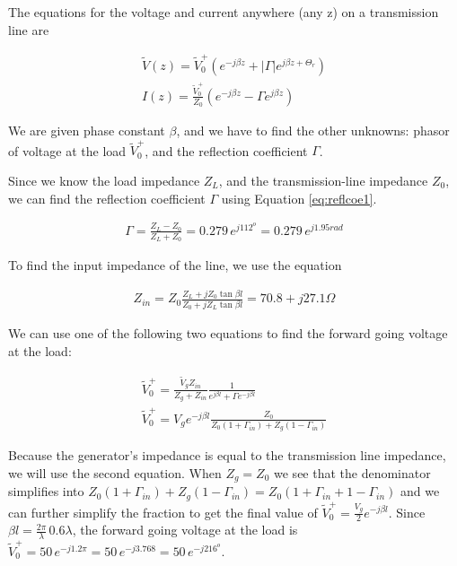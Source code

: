 \documentclass{ximera}
\begin{document}
\begin{example}
\begin{explanation}

The equations for the voltage and current anywhere (any z) on a transmission line  are


\begin{eqnarray}
\tilde{V}(z)= \tilde{V}_0^+ (e^{-j \beta z} + |\Gamma|  e^{j \beta z + \Theta_r}  ) \label{eq:vtlfin} \\
I(z)=   \frac{\tilde{V}_0^+}{Z_0}  (e^{-j \beta z} - \Gamma  e^{j \beta z}  ) \label{eq:itlfin}
\end{eqnarray}

We are given phase constant $\beta$, and we have to find the other unknowns: phasor of voltage at the load $\tilde{V}_0^+$, and the reflection coefficient $\Gamma$.    

Since we know the load impedance $Z_L$, and the transmission-line impedance $Z_0$, we can find the reflection coefficient $\Gamma$ using Equation \ref{eq:reflcoe1}.

\begin{eqnarray}
\Gamma =  \frac{Z_L -Z_0}{Z_L +Z_0}=0.279 \, e^{j112^o}=0.279 \, e^{j1.95 \unit{rad}} \label{eq:reflcoe1}
\end{eqnarray}

To find the input impedance of the line, we use the equation 


\begin{eqnarray}
Z_{in}= Z_0 \frac{Z_L+ j Z_0 \tan \beta l}{Z_0+ j Z_L \tan \beta l} = 70.8+ j 27.1 \Omega
\end{eqnarray}

We can use one of the following two equations to find the forward going voltage at the load:

\begin{eqnarray}
\tilde{V}_0^+= \frac{\tilde{V}_g Z_{in}}{Z_g + Z_{in}} \frac{1}{e^{j \beta l} + \Gamma e^{-j \beta l}} \\
\tilde{V}_0^+=V_g e^{-j \beta l} \frac{Z_0}{Z_0 (1+\Gamma_{in}) +Z_g (1-\Gamma_{in})}
\end{eqnarray}

Because the generator's impedance is equal to the transmission line impedance, we will use the second equation. When $Z_g=Z_0$ we see that the denominator simplifies into $Z_0 (1+\Gamma_{in}) +Z_g (1-\Gamma_{in}) = Z_0 (1+\Gamma_{in}+1-\Gamma_{in})$ and we can further simplify the fraction to get the final value of $\tilde{V}_0^+=\frac{V_g}{2} e^{-j \beta l}$. Since $\beta l = \frac{2 \pi}{\lambda} \, 0.6 \lambda$, the forward going voltage at the load is $\tilde{V}_0^+=50 \, e^{-j1.2 \pi} = 50 \, e^{-j3.768} =50 \, e^{-j216^o} $.




\end{explanation}
\end{example}
\end{document}
